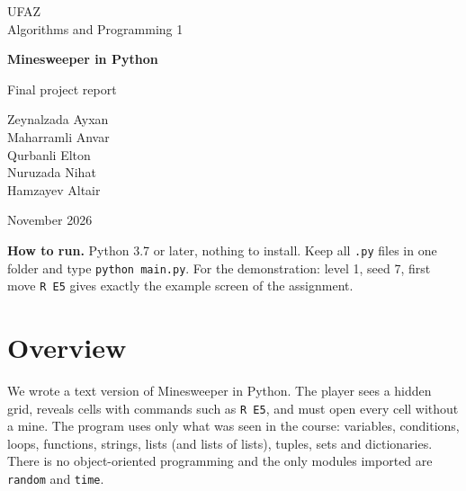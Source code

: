 \documentclass[11pt,a4paper]{article}
\newcommand{\code}[1]{\texttt{#1}}
\begin{document}
\begin{titlepage}
\centering
\vspace*{1.5cm}
{\large UFAZ\\[2pt] Algorithms and Programming 1\par}
\vspace{2.2cm}
{\Huge\bfseries Minesweeper in Python\par}
\vspace{0.4cm}
{\large Final project report\par}
\vspace{2.2cm}
{\large
Zeynalzada Ayxan\\[2pt]
Maharramli Anvar\\[2pt]
Qurbanli Elton\\[2pt]
Nuruzada Nihat\\[2pt]
Hamzayev Altair\par}
\vfill
{\large November 2026\par}
\end{titlepage}

\tableofcontents
\vspace{6mm}
\noindent\textbf{How to run.} Python 3.7 or later, nothing to install. Keep all \code{.py} files in one
folder and type \code{python main.py}. For the demonstration: level 1, seed 7, first move \code{R E5}
gives exactly the example screen of the assignment.
\vspace{4mm}

\section{Overview}

We wrote a text version of Minesweeper in Python. The player sees a hidden grid, reveals cells with
commands such as \code{R E5}, and must open every cell without a mine. The program uses only what was
seen in the course: variables, conditions, loops, functions, strings, lists (and lists of lists),
tuples, sets and dictionaries. There is no object-oriented programming and the only modules imported
are \code{random} and \code{time}.
\end{document}
